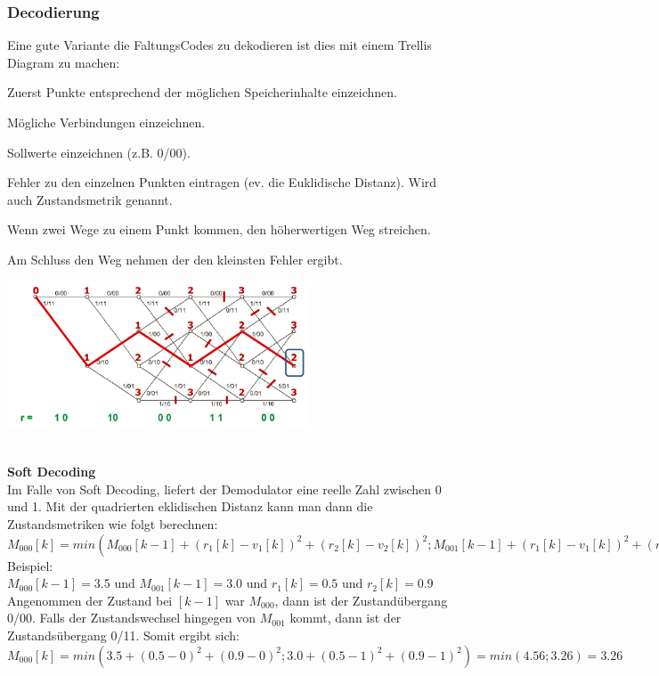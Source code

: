 \subsubsection{Decodierung}
Eine gute Variante die FaltungsCodes zu dekodieren ist dies mit einem Trellis
Diagram zu machen: \\
\begin{minipage}{10cm}
	\begin{liste}
		\item Zuerst Punkte entsprechend der m\"oglichen Speicherinhalte einzeichnen.
		\item M\"ogliche Verbindungen einzeichnen.
		\item Sollwerte einzeichnen (z.B. 0/00).
		\item Fehler zu den einzelnen Punkten eintragen (ev. die Euklidische Distanz). Wird auch Zustandsmetrik genannt.
		\item Wenn zwei Wege zu einem Punkt kommen, den h\"oherwertigen Weg streichen.
		\item Am Schluss den Weg nehmen der den kleinsten Fehler ergibt.
	\end{liste}
\end{minipage}
\begin{minipage}{9cm}
	\includegraphics[width=9cm]{./bilder/Trelli.png}
\end{minipage}\\
\textbf{Soft Decoding}\\
Im Falle von Soft Decoding, liefert  der Demodulator eine reelle Zahl zwischen 0 und 1. Mit der quadrierten 
eklidischen Distanz kann man dann die Zustandsmetriken wie folgt berechnen: \\
$M_{000}[k]=min(M_{000}[k-1]+(r_1[k]-v_1[k])^2+(r_2[k]-v_2[k])^2; M_{001}[k-1]+(r_1[k]-v_1[k])^2+(r_2[k]-v_2[k])^2)$ \\
Beispiel:\\
$M_{000}[k-1]=3.5$ und $M_{001}[k-1]=3.0$ und $r_1[k]=0.5$ und $r_2[k]=0.9$\\
Angenommen der Zustand bei $[k-1]$ war $M_{000}$, dann ist der Zustandübergang 0/00. Falls der Zustandswechsel 
hingegen von $M_{001}$ kommt, dann ist der Zustandsübergang 0/11. Somit ergibt sich:\\
$M_{000}[k]=min(3.5+(0.5-0)^2+(0.9-0)^2; 3.0+(0.5-1)^2+(0.9-1)^2)=min(4.56; 3.26)=3.26$ \\



